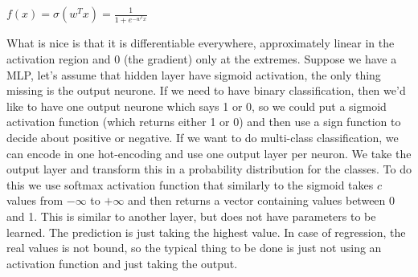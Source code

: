 \begin{center}
	$\displaystyle f(x)=\sigma(w^Tx)=\frac{1}{1+e^{-w^Tx}}$
\end{center}
What is nice is that it is differentiable everywhere, approximately linear in the activation region and 0 (the gradient) only at the extremes.\newline
Suppose we have a MLP, let's assume that hidden layer have sigmoid activation, the only thing missing is the output neurone. \newline
If we need to have binary classification, then we'd like to have one output neurone which says 1 or 0, so we could put a sigmoid activation function (which returns either 1 or 0) and then use a sign function to decide about positive or negative. \newline
If we want to do multi-class classification, we can encode in one hot-encoding and use one output layer per neuron. We take the output layer and transform this in a probability distribution for the classes. To do this we use softmax activation function that similarly to the sigmoid takes $c$ values from $-\infty$ to $+\infty$ and then returns a vector containing values between 0 and 1. This is similar to another layer, but does not have parameters to be learned. The prediction is just taking the highest value. \newline
In case of regression, the real values is not bound, so the typical thing to be done is just not using an activation function and just taking the output. \newline
